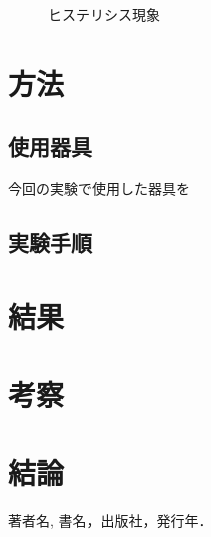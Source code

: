 \documentclass[11pt,dvipdfmx]{jarticle}
\begin{document}
\begin{figure}[htb]
    	\centering
        \vspace{5mm}
        \caption{ヒステリシス現象}
        \label{fig:hys:hizumi}
\end{figure}

\section{方法}
\subsection{使用器具}
今回の実験で使用した器具を

\subsection{実験手順}


\section{結果}
\section{考察}
\section{結論}

\begin{thebibliography}{9}%
	 著者名, 書名，出版社，発行年．
\end{thebibliography}
\end{document}

